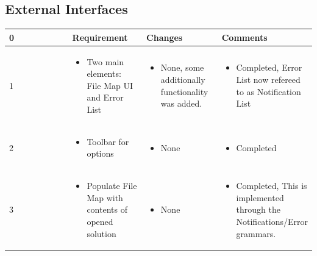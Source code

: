 \documentclass[letterpaper,10pt,titlepage,draftclsnofoot,onecolumn,onesided] {IEEEtran}
\begin{document}
\subsection{External Interfaces}
\small{
\begin{center}
	\begin{singlespace}
		\begin{tabular}{ |  p{0.25\linewidth}  |  p{0.25\linewidth}  | p{0.25\linewidth} | p{0.25\linewidth} |}
		\hline
		0 & Requirement & Changes & Comments \\ \hline
		
			1
		& 
			\begin{itemize}
				\item Two main elements: File Map UI and Error List
			\end{itemize}
		& 
			\begin{itemize}
				\item None, some additionally functionality was added.
			\end{itemize}
		&
			\begin{itemize}
				\item Completed, Error List now refereed to as Notification List
			\end{itemize} 
		
        \\ \hline

			2
		& 
			\begin{itemize}
				\item Toolbar for options
			\end{itemize}
		& 
			\begin{itemize}
				\item None
			\end{itemize}
		&
			\begin{itemize}
				\item Completed
			\end{itemize} 
		
        \\ \hline

            3
		& 
			\begin{itemize}
				\item Populate File Map with contents of opened solution
			\end{itemize}
		& 
			\begin{itemize}
				\item None
			\end{itemize}
		&
			\begin{itemize}
				\item Completed, This is implemented through the Notifications/Error grammars.
			\end{itemize} 
		

\end{tabular}
\end{singlespace}
\end{center}}
\end{document}

